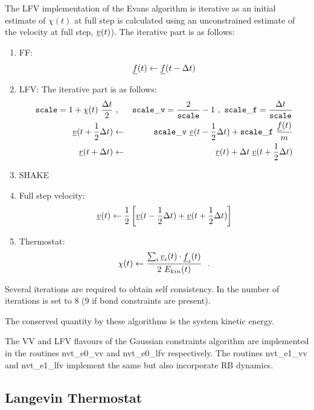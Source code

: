 The LFV implementation of the Evans algorithm is iterative as an
initial estimate of $\chi (t)$ at full step is calculated using an
unconstrained estimate of the velocity at full step, $\mbox{$\underline{v}$}(t)$).
The iterative part is as follows:
\begin{enumerate}
\item FF:
\begin{equation}
\mbox{$\underline{f}$}(t) \leftarrow \mbox{$\underline{f}$}(t - \Delta t)
\end{equation}
\item LFV: The iterative part is as follows:
\begin{eqnarray}
{\tt scale} = 1 + \chi (t)~\frac{\Delta t}{2} &~,~&
{\tt scale\_v} = \frac{2}{\tt scale}-1 ~,~
{\tt scale\_f} = \frac{\Delta t}{\tt scale} \nonumber \\
\mbox{$\underline{v}$}(t + {1 \over 2} \Delta t) &\leftarrow&
{\tt scale\_v}~\mbox{$\underline{v}$}(t - {1 \over 2} \Delta t) +
{\tt scale\_f}~{\mbox{$\underline{f}$}(t) \over m} \\
\mbox{$\underline{r}$}(t + \Delta t) &\leftarrow& \mbox{$\underline{r}$}(t) + \Delta t \;
\mbox{$\underline{v}$}(t + {1 \over 2} \Delta t) \nonumber
\end{eqnarray}
\item SHAKE
\item Full step velocity:
\begin{equation}
\mbox{$\underline{v}$}(t) \leftarrow {1 \over 2} \left[ \mbox{$\underline{v}$}(t - {1 \over 2} \Delta t) +
\mbox{$\underline{v}$}(t + {1 \over 2} \Delta t) \right]
\end{equation}
\item Thermostat:
\begin{equation}
\chi (t) \leftarrow \frac {\sum_{i} \mbox{$\underline{v}$}_{i}(t) \cdot
\mbox{$\underline{f}$}_{i}(t)} {2~E_{kin}(t)}~~.
\end{equation}
\end{enumerate}
Several iterations are required to obtain self consistency.  In \D
the number of iterations is set to $8$ ($9$ if bond constraints
are present).

The conserved quantity by these algorithms is the system kinetic
energy.

The VV and LFV flavours of the Gaussian constraints algorithm are implemented
in the \D routines {\sc nvt\_e0\_vv} and {\sc nvt\_e0\_lfv} respectively.
The routines {\sc nvt\_e1\_vv} and {\sc nvt\_e1\_lfv} implement the
same but also incorporate RB dynamics.

\subsection{Langevin Thermostat}


